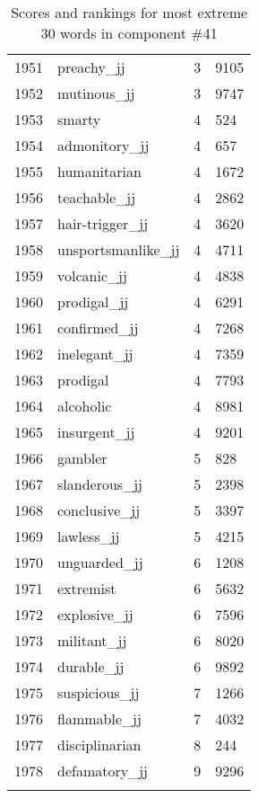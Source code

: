 \begin{longtable}[!htbp]{| rlr@{.}l |}
    1951 & preachy\_jj & 3 & 9105 \\
    1952 & mutinous\_jj & 3 & 9747 \\
    1953 & smarty & 4 & 524 \\
    1954 & admonitory\_jj & 4 & 657 \\
    1955 & humanitarian & 4 & 1672 \\
    1956 & teachable\_jj & 4 & 2862 \\
    1957 & hair-trigger\_jj & 4 & 3620 \\
    1958 & unsportsmanlike\_jj & 4 & 4711 \\
    1959 & volcanic\_jj & 4 & 4838 \\
    1960 & prodigal\_jj & 4 & 6291 \\
    1961 & confirmed\_jj & 4 & 7268 \\
    1962 & inelegant\_jj & 4 & 7359 \\
    1963 & prodigal & 4 & 7793 \\
    1964 & alcoholic & 4 & 8981 \\
    1965 & insurgent\_jj & 4 & 9201 \\
    1966 & gambler & 5 & 828 \\
    1967 & slanderous\_jj & 5 & 2398 \\
    1968 & conclusive\_jj & 5 & 3397 \\
    1969 & lawless\_jj & 5 & 4215 \\
    1970 & unguarded\_jj & 6 & 1208 \\
    1971 & extremist & 6 & 5632 \\
    1972 & explosive\_jj & 6 & 7596 \\
    1973 & militant\_jj & 6 & 8020 \\
    1974 & durable\_jj & 6 & 9892 \\
    1975 & suspicious\_jj & 7 & 1266 \\
    1976 & flammable\_jj & 7 & 4032 \\
    1977 & disciplinarian & 8 & 244 \\
    1978 & defamatory\_jj & 9 & 9296 \\
    \hline
    \caption{Scores and rankings for most extreme 30 words in component \#41} \\
\end{longtable}
